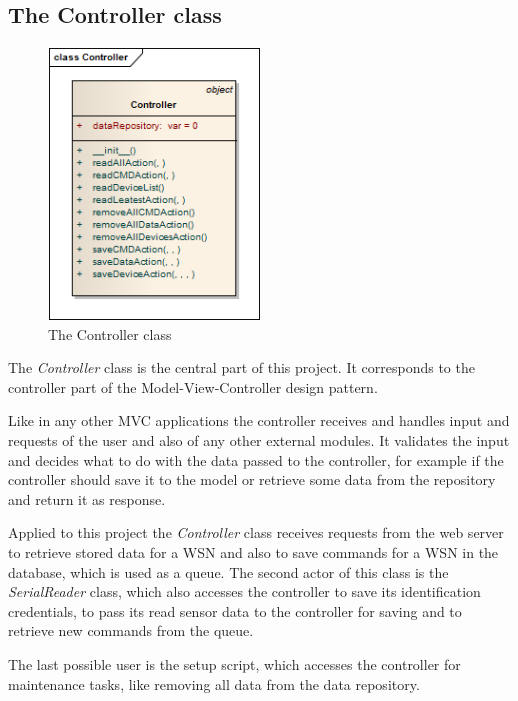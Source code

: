 \newpage
\subsection{The Controller class}
\begin{figure}[H]
   \centering
   \includegraphics[width=0.5\textwidth]{pic/Controller.png}%
   \caption{The Controller class}
   \label{Controllerpic}%
\end{figure}

The \textit{Controller} class is the central part of this project. It corresponds to the controller part of the Model-View-Controller design pattern.

Like in any other MVC applications the controller receives and handles input and requests of the user and also of any other external modules. 
It validates the input and decides what to do with the data passed to the controller, 
for example if the controller should save it to the model or retrieve some data from the repository and return it as response.

Applied to this project the \textit{Controller} class receives requests from the web server to retrieve stored data for a 
WSN and also to save commands for a WSN in the database, which is used as a queue. The second actor of this class is the 
\textit{SerialReader} class, which also accesses the controller to save its identification credentials, 
to pass its read sensor data to the controller for saving and to retrieve new commands from the queue.

The last possible user is the setup script, which accesses the controller for maintenance tasks, like removing all data from the data repository.



